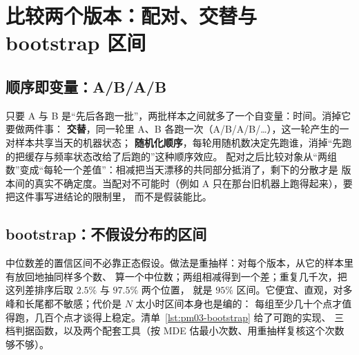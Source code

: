 \documentclass[12pt,a4paper,fontset=fandol]{ctexbook}
\newcommand{\Mx}[1]{\textsf{#1}}
\begin{document}
\section{比较两个版本：配对、交替与 bootstrap 区间}
\label{sec:pm03-compare}

\subsection{顺序即变量：A/B/A/B}
\label{sub:pm03-abab}

只要 A 与 B 是``先后各跑一批''，两批样本之间就多了一个自变量：时间。消掉它要做两件事：
\textbf{交替}，同一轮里 A、B 各跑一次（A/B/A/B/\ldots），这一轮产生的一对样本共享当天的机器状态；
\textbf{随机化顺序}，每轮用随机数决定先跑谁，消掉``先跑的把缓存与频率状态改给了后跑的''这种顺序效应。
配对之后比较对象从``两组数''变成``每轮一个差值''：相减把当天漂移的共同部分抵消了，剩下的分散才是
版本间的真实不确定度。当配对不可能时（例如 A 只在那台旧机器上跑得起来），要把这件事写进结论的限制里，
而不是假装能比。

\subsection{bootstrap：不假设分布的区间}
\label{sub:pm03-bootstrap}

中位数差的置信区间不必靠正态假设。做法是重抽样：对每个版本，从它的样本里有放回地抽同样多个数、
算一个中位数；两组相减得到一个差；重复几千次，把这列差排序后取 $2.5\%$ 与 $97.5\%$ 两个位置，
就是 $95\%$ 区间。它便宜、直观，对多峰和长尾都不敏感；代价是 $N$ 太小时区间本身也是编的：
每组至少几十个点才值得跑，几百个点才谈得上稳定。清单~\ref{lst:pm03-bootstrap} 给了可跑的实现、
三档判据函数，以及两个配套工具（按 \Mx{MDE} 估最小次数、用重抽样复核这个次数够不够）。
\end{document}

